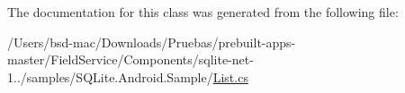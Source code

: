 The documentation for this class was generated from the following file\+:\begin{DoxyCompactItemize}
\item 
/\+Users/bsd-\/mac/\+Downloads/\+Pruebas/prebuilt-\/apps-\/master/\+Field\+Service/\+Components/sqlite-\/net-\/1../samples/\+S\+Q\+Lite.\+Android.\+Sample/\hyperlink{_s_q_lite_8_android_8_sample_2_list_8cs}{List.\+cs}\end{DoxyCompactItemize}
